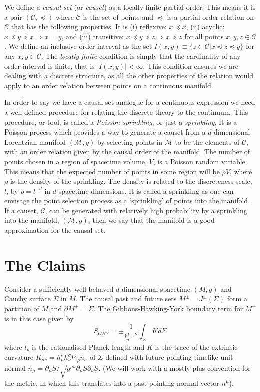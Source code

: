 \documentclass[12pt]{article}
\newcommand{\be}{\begin{equation}}
\newcommand{\ee}{\end{equation}}
\newcommand{\mb}[1]{\marginnote{\texttt{\small MB:\,#1}}}
\begin{document}
We define a \textit{causal set} (or \textit{causet}) as a locally finite partial order. This means it is a pair $(\mathcal{C},\preceq)$ where $\mathcal{C}$ is the set of points and $\preceq$ is a partial order relation on $\mathcal{C}$ that has the following properties. It is (i) reflexive: $x\preceq x$, (ii) acyclic: $x\preceq y\preceq x \Rightarrow x=y$, and (iii) transitive: $x\preceq y\preceq z \Rightarrow x\preceq z$ for all points $x, y, z \in \mathcal{C}$. We define an inclusive order interval as the set $I(x,y)\equiv \lbrace z\in\mathcal{C}|x\preceq z\preceq y\rbrace$ for any $x, y\in\mathcal{C}$. The \textit{locally finite} condition is simply that the cardinality of any order interval is finite, that is $|I(x,y)|<\infty$. This condition ensures we are dealing with a discrete structure, as all the other properties of the relation would apply to an order relation between points on a continuous manifold.

In order to say we have a causal set analogue for a continuous expression we need a well defined procedure for relating the discrete theory to the continuum. This procedure, or tool, is called a \textit{Poisson sprinkling}, or just a \textit{sprinkling}. It is a Poisson process which provides a way to generate a causet from a $d$-dimensional Lorentzian manifold $(\mathcal{M},g)$ by selecting points in $\mathcal{M}$ to be the elements of $\mathcal{C}$, with an order relation given by the causal order of the manifold. The number of points chosen in a region of spacetime volume, $V$, is a Poisson random variable. This means that the expected number of points in some region will be $\rho V$, where $\rho$ is the density of the sprinkling. The density is related to the discreteness scale, $l$, by $\rho=l^{-d}$ in $d$ spacetime dimensions. It is called a sprinkling as one can envisage the point selection process as a `sprinkling' of points into the manifold. If a causet, $\mathcal{C}$, can be generated with relatively high probability by a sprinkling into the manifold, $(\mathcal{M},g)$, then we say that the manifold is a good approximation for the causal set.

\section{The Claims}

Consider a sufficiently well-behaved $d$-dimensional spacetime $(M,g)$ and Cauchy surface $\Sigma$ in $M$. The causal past and future sets $M^\pm=J^\pm(\Sigma)$ form a partition of $M$ and $\partial M^\pm = \Sigma$. The Gibbons-Hawking-York boundary term for $M^\pm$ is in this case given by
\be\label{eq:GHYBT_in_continuum}
S_{GHY} = \pm \frac{1}{l_p^{d-2}}\int_{\Sigma} K d\Sigma
\ee
where $l_p$ is the rationalised Planck length and $K$ is the trace of the extrinsic curvature $K_{\mu\nu}=h_{\mu}^\rho h_\nu^\sigma \nabla_\rho n_\sigma$ of $\Sigma$ defined with future-pointing timelike unit normal $n_{\mu}=\partial_\mu S/\sqrt{g^{\mu\nu}\partial_\mu S\partial_\nu S}$. (We will work with a mostly plus convention for the metric, in which this translates into a past-pointing normal vector $n^{\mu}$).\mb{ok or more detail on conventions needed?}
\end{document}
